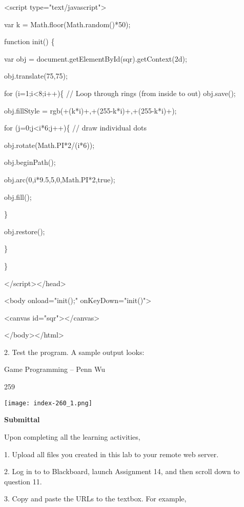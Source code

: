 \documentclass[
]{article}
\begin{document}
\textless script type="text/javascript"\textgreater{}

var k = Math.floor(Math.random()*50);

function init() \{

var obj =
document.getElementById(\textquotesingle sqr\textquotesingle).getContext(\textquotesingle2d\textquotesingle);

obj.translate(75,75);

for (i=1;i\textless8;i++)\{ // Loop through rings (from inside to out)
obj.save();

obj.fillStyle =
\textquotesingle rgb(\textquotesingle+(k*i)+\textquotesingle,\textquotesingle+(255-k*i)+\textquotesingle,\textquotesingle+(255-k*i)+\textquotesingle)\textquotesingle;

for (j=0;j\textless i*6;j++)\{ // draw individual dots

obj.rotate(Math.PI*2/(i*6));

obj.beginPath();

obj.arc(0,i*9.5,5,0,Math.PI*2,true);

obj.fill();

\}

obj.restore();

\}

\}

\textless/script\textgreater\textless/head\textgreater{}

\textless body onload="init();" onKeyDown="init()"\textgreater{}

\textless canvas id="sqr"\textgreater\textless/canvas\textgreater{}

\textless/body\textgreater\textless/html\textgreater{}

2. Test the program. A sample output looks:

Game Programming -- Penn Wu

259

\protect\hypertarget{index_split_013.htmlux5cux23p260}{}{}\texttt{[image: index-260\_1.png]}

\textbf{}

\textbf{Submittal}

Upon completing all the learning activities,

1. Upload all files you created in this lab to your remote web server.

2. Log in to to Blackboard, launch Assignment 14, and then scroll down
to question 11.

3. Copy and paste the URLs to the textbox. For example,
\end{document}
